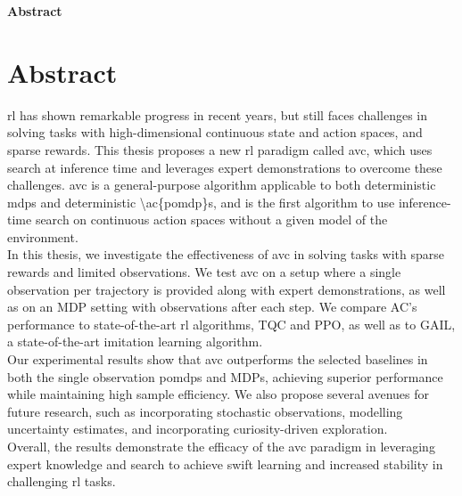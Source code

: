 \clearemptydoublepage
{}
{}

\vspace*{2cm}
\begin{center}
{\Large \textbf{Abstract}}
\end{center}
\vspace{1cm}

\chapter*{Abstract}
\label{chapter:Abstract}

\ac{rl} has shown remarkable progress in recent years, but still faces challenges in solving tasks with high-dimensional 
continuous state and action spaces, and sparse rewards. This thesis proposes a new \ac{rl} paradigm called \ac{avc}, which uses search at 
inference time and leverages expert demonstrations to overcome these challenges. \ac{avc} is a general-purpose algorithm applicable to both deterministic 
\ac{mdp}s and deterministic \ac{\ac{pomdp}}s, and is the first algorithm to use inference-time search on continuous 
action spaces without a given model of the environment.\\

In this thesis, we investigate the effectiveness of \ac{avc} in solving tasks with sparse rewards and limited observations. We test \ac{avc} on 
a setup where a single observation per trajectory is provided along with expert demonstrations, as well as on an MDP setting with observations 
after each step. We compare AC's performance to state-of-the-art \ac{rl} algorithms, TQC and PPO, as well as to GAIL, a state-of-the-art imitation 
learning algorithm. \\

Our experimental results show that \ac{avc} outperforms the selected baselines in both the single observation \ac{pomdp}s and MDPs, achieving superior 
performance while maintaining high sample efficiency. We also propose several avenues for future research, such as incorporating stochastic 
observations, modelling uncertainty estimates, and incorporating curiosity-driven exploration.\\

Overall, the results demonstrate the efficacy of the \ac{avc} paradigm in leveraging expert knowledge and search to achieve swift learning and 
increased stability in challenging \ac{rl} tasks.